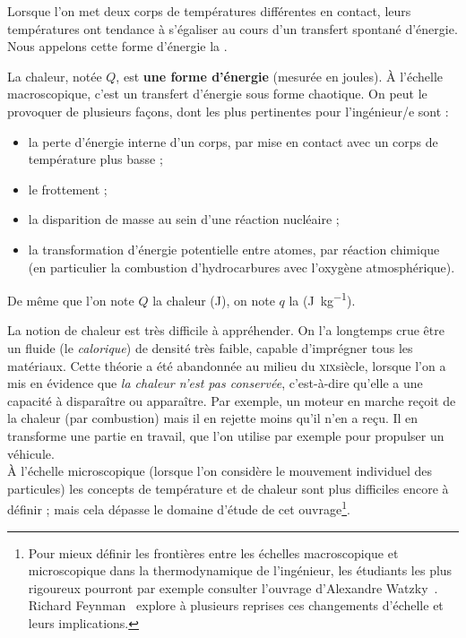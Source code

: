 		Lorsque l’on met deux corps de températures différentes en contact, leurs températures ont tendance à s’égaliser au cours d’un transfert spontané d’énergie. Nous appelons cette forme d’énergie la .

		La chaleur, notée $Q$, est \textbf{une forme d’énergie} (mesurée en \si{joules}). À l’échelle macroscopique, c’est un transfert d’énergie sous forme chaotique. On peut le provoquer de plusieurs façons, dont les plus pertinentes pour l’ingénieur/e sont :

		\begin{itemize}
		
			\item la perte d’énergie interne d’un corps, par mise en contact avec un corps de température plus basse ;

			\item le frottement ;
			
			\item la disparition de masse au sein d’une réaction nucléaire ;
			
			\item la transformation d’énergie potentielle entre atomes, par réaction chimique (en particulier la combustion d’hydrocarbures avec l’oxygène atmosphérique).

		\end{itemize}
		
		De même que l’on note $Q$ la chaleur (\si{\joule}), on note $q$ la  (\si{\joule\per\kilogram}).
		
		La notion de chaleur est très difficile à appréhender. On l’a longtemps crue être un fluide (le \textit{calorique}) de densité très faible, capable d’imprégner tous les matériaux. Cette théorie a été abandonnée au milieu du \textsc{xix}\ieme siècle, lorsque l’on a mis en évidence que \textit{la chaleur n’est pas conservée}, c’est-à-dire qu’elle a une capacité à disparaître ou apparaître. Par exemple, un moteur en marche reçoit de la chaleur (par combustion) mais il en rejette moins qu’il n’en a reçu. Il en transforme une partie en travail, que l’on utilise par exemple pour propulser un véhicule. \\
		À l’échelle microscopique (lorsque l’on considère le mouvement individuel des particules) les concepts de température et de chaleur sont plus difficiles encore à définir ; mais cela dépasse le domaine d’étude de cet ouvrage\footnote{Pour mieux définir les frontières entre les échelles macroscopique et microscopique dans la thermodynamique de l’ingénieur, les étudiants les plus rigoureux pourront par exemple consulter l’ouvrage d’Alexandre Watzky~\cite{watzky2007}. Richard Feynman~\cite{feynman1963, feynman1963fr} explore à plusieurs reprises ces changements d’échelle et leurs implications.}\nolinebreak.


